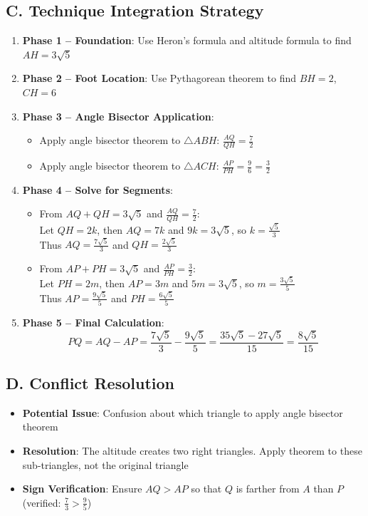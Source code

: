 \documentclass[12pt]{article}
\begin{document}
\begin{conversionbox}
\subsection*{C. Technique Integration Strategy}
\begin{enumerate}
    \item \textbf{Phase 1 -- Foundation}: Use Heron's formula and altitude formula to find $AH = 3\sqrt{5}$
    \item \textbf{Phase 2 -- Foot Location}: Use Pythagorean theorem to find $BH = 2$, $CH = 6$
    \item \textbf{Phase 3 -- Angle Bisector Application}: 
    \begin{itemize}
        \item Apply angle bisector theorem to $\triangle ABH$: $\frac{AQ}{QH} = \frac{7}{2}$
        \item Apply angle bisector theorem to $\triangle ACH$: $\frac{AP}{PH} = \frac{9}{6} = \frac{3}{2}$
    \end{itemize}
    \item \textbf{Phase 4 -- Solve for Segments}:
    \begin{itemize}
        \item From $AQ + QH = 3\sqrt{5}$ and $\frac{AQ}{QH} = \frac{7}{2}$: \\
        Let $QH = 2k$, then $AQ = 7k$ and $9k = 3\sqrt{5}$, so $k = \frac{\sqrt{5}}{3}$ \\
        Thus $AQ = \frac{7\sqrt{5}}{3}$ and $QH = \frac{2\sqrt{5}}{3}$
        \item From $AP + PH = 3\sqrt{5}$ and $\frac{AP}{PH} = \frac{3}{2}$: \\
        Let $PH = 2m$, then $AP = 3m$ and $5m = 3\sqrt{5}$, so $m = \frac{3\sqrt{5}}{5}$ \\
        Thus $AP = \frac{9\sqrt{5}}{5}$ and $PH = \frac{6\sqrt{5}}{5}$
    \end{itemize}
    \item \textbf{Phase 5 -- Final Calculation}:
    $$PQ = AQ - AP = \frac{7\sqrt{5}}{3} - \frac{9\sqrt{5}}{5} = \frac{35\sqrt{5} - 27\sqrt{5}}{15} = \frac{8\sqrt{5}}{15}$$
\end{enumerate}

\subsection*{D. Conflict Resolution}
\begin{itemize}[leftmargin=*]
    \item \textbf{Potential Issue}: Confusion about which triangle to apply angle bisector theorem
    \item \textbf{Resolution}: The altitude creates two right triangles. Apply theorem to these sub-triangles, not the original triangle
    \item \textbf{Sign Verification}: Ensure $AQ > AP$ so that $Q$ is farther from $A$ than $P$ (verified: $\frac{7}{3} > \frac{9}{5}$)
\end{itemize}
\end{conversionbox}
\end{document}
